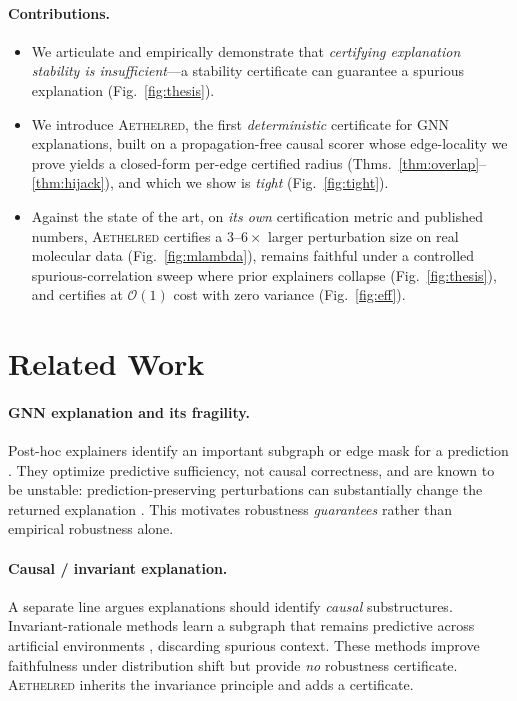 \documentclass[letterpaper]{article}
\newcommand{\aeth}{\textsc{Aethelred}}
\newcommand{\bigO}{\mathcal{O}}
\begin{document}
\paragraph{Contributions.}
\begin{itemize}
  \item We articulate and empirically demonstrate that \emph{certifying
        explanation stability is insufficient}---a stability certificate can
        guarantee a spurious explanation (Fig.~\ref{fig:thesis}).
  \item We introduce \aeth{}, the first \emph{deterministic} certificate for GNN
        explanations, built on a propagation-free causal scorer whose
        edge-locality we prove yields a closed-form per-edge certified radius
        (Thms.~\ref{thm:overlap}--\ref{thm:hijack}), and which we show is
        \emph{tight} (Fig.~\ref{fig:tight}).
  \item Against the state of the art, on \emph{its own} certification metric and
        published numbers, \aeth{} certifies a $3$--$6\times$ larger
        perturbation size on real molecular data (Fig.~\ref{fig:mlambda}),
        remains faithful under a controlled spurious-correlation sweep where
        prior explainers collapse (Fig.~\ref{fig:thesis}), and certifies at
        $\bigO(1)$ cost with zero variance (Fig.~\ref{fig:eff}).
\end{itemize}

\section{Related Work}
\label{sec:related}

\paragraph{GNN explanation and its fragility.}
Post-hoc explainers identify an important subgraph or edge mask for a prediction
\cite{ying2019gnnexplainer,luo2020pgexplainer,wang2021refine,miao2022gsat}. They
optimize predictive sufficiency, not causal correctness, and are known to be
unstable: prediction-preserving perturbations can substantially change the
returned explanation \cite{fragile2024}. This motivates robustness
\emph{guarantees} rather than empirical robustness alone.

\paragraph{Causal / invariant explanation.}
A separate line argues explanations should identify \emph{causal} substructures.
Invariant-rationale methods \cite{wu2022dir} learn a subgraph that remains
predictive across artificial environments \cite{arjovsky2019irm}, discarding
spurious context. These methods improve faithfulness under distribution shift but
provide \emph{no} robustness certificate. \aeth{} inherits the invariance
principle and adds a certificate.
\end{document}
